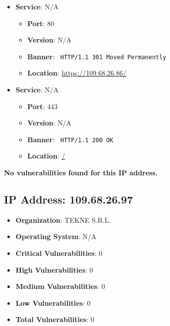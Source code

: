 \documentclass{article}
\begin{document}
\begin{itemize}
    
        \item \textbf{Service}: N/A
        \begin{itemize}
            \item \textbf{Port}: 80
            \item \textbf{Version}:  N/A 
            \item \textbf{Banner}: \texttt{ HTTP/1.1 301 Moved Permanently
 }
            \item \textbf{Location}: \href{ https://109.68.26.86/ }{ https://109.68.26.86/ }
        \end{itemize}
    
        \item \textbf{Service}: N/A
        \begin{itemize}
            \item \textbf{Port}: 443
            \item \textbf{Version}:  N/A 
            \item \textbf{Banner}: \texttt{ HTTP/1.1 200 OK
 }
            \item \textbf{Location}: \href{ / }{ / }
        \end{itemize}
    
\end{itemize}


\textbf{No vulnerabilities found for this IP address.}


\clearpage



\subsection*{IP Address: 109.68.26.97}

\begin{itemize}
    \item \textbf{Organization}: TEKNE S.R.L.
    \item \textbf{Operating System}:  N/A 
    \item \textbf{Critical Vulnerabilities}: 0
    \item \textbf{High Vulnerabilities}: 0
    \item \textbf{Medium Vulnerabilities}: 0
    \item \textbf{Low Vulnerabilities}: 0
    \item \textbf{Total Vulnerabilities}: 0
\end{itemize}
\end{document}
